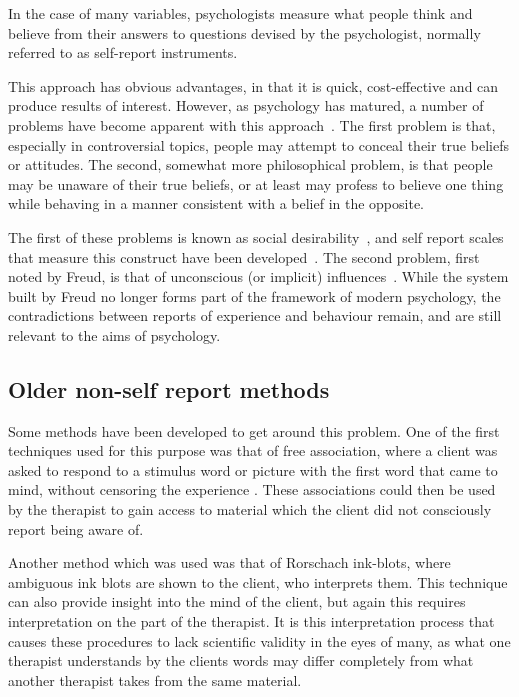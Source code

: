 In the case of many variables, psychologists measure what people think and believe from their answers to questions devised by the psychologist, normally referred to as self-report instruments. 

This approach has obvious advantages, in that it is quick, cost-effective and can produce results of interest. However, as psychology has matured, a number of problems have become apparent with this approach~\cite{Nisbett1977}.  The first problem is that, especially in controversial topics, people may attempt to conceal their true beliefs or attitudes. The second, somewhat more philosophical problem, is that people may be unaware of their true beliefs, or at least may profess to believe one thing while behaving in a manner consistent with a belief in the opposite. 

The first of these problems is known as social desirability~\cite{Egloff2003}, and  self report scales that measure this construct have been developed~\cite{Giebel2008}. The second problem, first noted by Freud, is that of unconscious (or implicit) influences~\cite{Hofmann2008}. While the system built by Freud no longer forms part of the framework of modern psychology, the contradictions between reports of experience and behaviour remain, and are still relevant to the aims of psychology. %



\subsection{Older non-self report methods}
\label{sec:older-non-self}

Some methods have been developed to get around this problem. One of the first techniques used for this purpose was that of free association, where a client was asked to respond to a stimulus word or picture with the first word that came to mind, without censoring the experience \cite{Hofmann2008}. These associations could then be used by the therapist to gain access to material which the client did not consciously report being aware of. 

Another method which was used was that of Rorschach ink-blots, where ambiguous ink blots are shown to the client, who interprets them. This technique can also provide insight into the mind of the client, but again this requires interpretation on the part of the therapist. It is this interpretation process that causes these procedures to lack scientific validity in the eyes of many, as what one therapist understands by the clients words may differ completely from what another therapist takes from the same material. 

